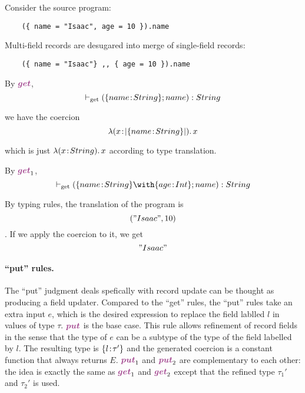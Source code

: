   Consider the source program:
  \begin{lstlisting}
    ({ name = "Isaac", age = 10 }).name
  \end{lstlisting}

  Multi-field records are desugared into merge of single-field records:
  \begin{lstlisting}
    ({ name = "Isaac"} ,, { age = 10 }).name
  \end{lstlisting}

  By $ \rulelabelget $,
  \[ \vdash_{\textrm{get}} (\{ name \!:\! String \}; {name}) : String \]

  we have the coercion
  \[ \lambda (x \!:\! \lvert \{ name \!:\! String \} \rvert).\, x \]

  which is just $ \lambda (x \!:\! String).\, x $ according to type translation.

  By $ \rulelabelgetleft $,
  \[ \turnsget (\recty {name} {String} \andop \recty {age} {Int}; {name}) : String \]


  By typing rules, the translation of the program is
  \[ ("Isaac", 10) \]. If we apply the coercion to it, we get
  \[ "Isaac" \]


\paragraph{``put'' rules.}

  The ``put'' judgment deals spefically with record update can be thought as
  producing a field updater. Compared to the ``get'' rules, the ``put'' rules
  take an extra input $ e $, which is the desired expression to replace the
  field lablled $ l $ in values of type $ \tau $. $ \rulelabelput $ is the base
  case. This rule allows refinement of record fields in the sense that the type
  of $ e $ can be a subtype of the type of the field labelled by $ l $. The
  resulting type is $ \{ l \!:\! \tau' \} $ and the generated coercion is a
  constant function that always returns $ E $. $ \rulelabelputleft $ and
  $ \rulelabelputright $ are complementary to each other: the idea is exactly the
  same as $ \rulelabelgetleft $ and $ \rulelabelgetright $ except that the refined type
  $ \tau_1' $ and $ \tau_2' $ is used.

